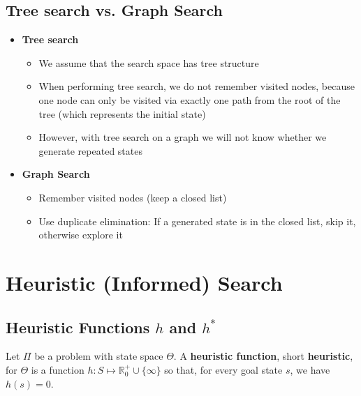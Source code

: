 \documentclass[conference]{styles/acmsiggraph}
\begin{document}
    \subsection{Tree search vs. Graph Search}
        \begin{itemize}
            \item \textbf{Tree search}
                \begin{itemize}
                    \item We assume that the search space has tree structure
                    \item When performing tree search, we do not remember visited nodes, because one node can only be visited via exactly one path from the root of the tree (which represents the initial state)
                    \item However, with tree search on a graph we will not know whether we generate repeated states
                \end{itemize}
            \item \textbf{Graph Search}
                \begin{itemize}
                    \item Remember visited nodes (keep a closed list)
                    \item Use duplicate elimination: If a generated state is in the closed list, skip it, otherwise explore it
                \end{itemize}
        \end{itemize}
        
        
        
        
        
        
        
        
        
        
\section{Heuristic (Informed) Search}
    \subsection{Heuristic Functions $h$ and $h^*$}
        Let $\Pi$ be a problem with state space $\Theta$.
        A \textbf{heuristic function}, short \textbf{heuristic}, for $\Theta$ is a function $h: S \mapsto \mathbb{R}_0^+ \cup \{\infty\}$ so that, for every goal state $s$, we have $h(s) = 0$.\newline
        
\end{document}
